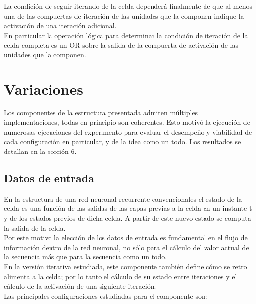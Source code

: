\documentclass{article}
\begin{document}
La condición de seguir iterando de la celda dependerá finalmente de que al menos una de las compuertas de iteración de las unidades que la componen indique la activación de una iteración adicional.\\

En particular la operación lógica para determinar la condición de iteración de la celda completa es un OR sobre la salida de la compuerta de activación de las unidades que la componen.

\section{Variaciones}


Los componentes de la estructura presentada admiten múltiples implementaciones, todas en principio son coherentes. Esto motivó la ejecución de numerosas ejecuciones del experimento para evaluar el desempeño y viabilidad de cada configuración en particular, y de la idea como un todo. Los resultados se detallan en la sección 6.\\


\subsection{Datos de entrada}


En la estructura de una red neuronal recurrente convencionales el estado de la celda es una función de las salidas de las capas previas a la celda en un instante t y de los estados previos de dicha celda. A partir de este nuevo estado se computa la salida de la celda.\\


Por este motivo la elección de los datos de entrada es fundamental en el flujo de información dentro de la red neuronal, no sólo para el cálculo del valor actual de la secuencia más que para la secuencia como un todo.\\


En la versión iterativa estudiada, este componente también define cómo se retro alimenta a la celda; por lo tanto el cálculo de su estado entre iteraciones y el cálculo de la activación de una siguiente iteración.\\


Las principales configuraciones estudiadas para el componente son:
\end{document}
